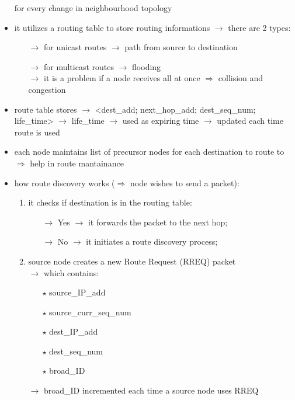 \begin{itemize}
        for every change in neighbourhood topology
    \item it utilizes a routing table to store routing informations $\rightarrow$ there are 2 types:
    \begin{itemize}
        \item[$\rightarrow$] for unicast routes $\rightarrow$ path from source to destination
        \item[$\rightarrow$] for multicast routes $\rightarrow$ flooding\\
        $\rightarrow$ it is a problem if a node receives all at once $\Rightarrow$ collision and congestion
    \end{itemize}
    \item route table stores $\rightarrow$ <dest\_add; next\_hop\_add; dest\_seq\_num; life\_time>
    $\rightarrow$ life\_time $\rightarrow$ used as expiring time $\rightarrow$ updated each time route is used
    \item each node maintains list of precursor nodes for each destination to route to\\$\Rightarrow$ help in route mantainance
    \newpage
    \item how route discovery works ($\Rightarrow$ node wishes to send a packet):
    \begin{enumerate}
        \item it checks if destination is in the routing table:
        \begin{itemize}
            \item[$\rightarrow$] Yes $\rightarrow$ it forwards the packet to the next hop;
            \item[$\rightarrow$] No $\rightarrow$ it initiates a route discovery process;
        \end{itemize}
        \item source node creates a new Route Request (RREQ) packet\\
        $\rightarrow$ which contains:
        \begin{itemize}
            \item[$\star$] source\_IP\_add
            \item[$\star$] source\_curr\_seq\_num
            \item[$\star$] dest\_IP\_add
            \item[$\star$] dest\_seq\_num
            \item[$\star$] broad\_ID
        \end{itemize}
        $\rightarrow$ broad\_ID incremented each time a source node uses RREQ

\end{enumerate}
\end{itemize}
